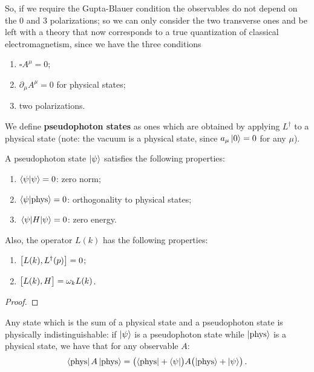 \documentclass[main.tex]{subfiles}
\begin{document}
So, if we require the Gupta-Blauer condition the observables do not depend on the 0 and 3 polarizations; so we can only consider the two transverse ones and be left with a theory that now corresponds to a true quantization of classical electromagnetism, since we have the three conditions
\begin{enumerate}
    \item \(\square A^{\mu } = 0\);
    \item \(\partial_{\mu } A^{\mu } = 0\) for physical states;
    \item two polarizations.
\end{enumerate}

We define \textbf{pseudophoton states} as ones which are obtained by applying \(L ^\dag\) to a physical state (note: the vacuum is a physical state, since \(a_{\mu } \ket{0} = 0\) for any \(\mu \)). 

\begin{claim}
A pseudophoton state \(\ket{\psi }\) satisfies the following properties: 
\begin{enumerate}
    \item \(\braket{\psi }{\psi } = 0\): zero norm;
    \item \(\braket{\psi }{\text{phys}} = 0\): orthogonality to physical states;
    \item \(\ev{H}{\psi } = 0\): zero energy. 
\end{enumerate}

Also, the operator \(L(k)\) has the following properties: 
\begin{enumerate}
    \item \(\qty[L(k), L ^\dag(p)] = 0\);
    \item \(\qty[L(k), H] = \omega_{k} L(k)\). 
\end{enumerate}
\end{claim}

\begin{proof}
\end{proof}

Any state which is the sum of a physical state and a pseudophoton state is physically indistinguishable: if \(\ket{\psi }\) is a pseudophoton state while \(\ket{\text{phys}}\) is a physical state, we have that for any observable \(A\): 
%
\begin{align}
\bra{\text{phys}} A \ket{\text{phys}} = \qty(\bra{\text{phys}} + \bra{\psi }) A \qty(\ket{\text{phys}} + \ket{\psi })
\,.
\end{align}
\end{document}
